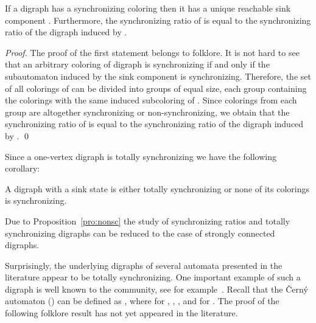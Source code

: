 \documentclass[runningheads]{llncs}
\begin{document}
\begin{proposition}\label{pro:nonsc}
If a digraph  has a synchronizing coloring then it has a unique reachable sink component .
Furthermore, the synchronizing ratio of  is equal to the synchronizing ratio of the digraph induced by .
\end{proposition}
\begin{proof}
The proof of the first statement belongs to folklore.
It is not hard to see that an arbitrary coloring  of digraph  is synchronizing if and only if the subautomaton  induced by the sink component  is synchronizing.
Therefore, the set of all colorings of  can be divided into groups of equal size, each group containing the colorings with the same induced subcoloring of .
Since colorings from each group are altogether synchronizing or non-synchronizing, we obtain that the
synchronizing ratio of  is equal to the synchronizing ratio of the digraph induced by .
\qed
\end{proof}

Since a one-vertex digraph is totally synchronizing we have the following corollary:
\begin{corollary}
A digraph with a sink state is either totally synchronizing or none of its colorings is synchronizing.
\end{corollary}

Due to Proposition~\ref{pro:nonsc} the study of synchronizing ratios and totally synchronizing digraphs can be reduced to the case of strongly connected digraphs.

Surprisingly, the underlying digraphs of several automata presented in the literature appear to be totally synchronizing. One important example of such a digraph is well known to the community, see for example~\cite{Volkov2008OpenProblemsOnSynchronizingAutomata}. Recall that the \v{C}ern\'{y} automaton  (\cite{Cerny1964}) can be defined as , where  for , , , and  for . The proof of the following folklore result has not yet appeared in the literature.
\end{document}
